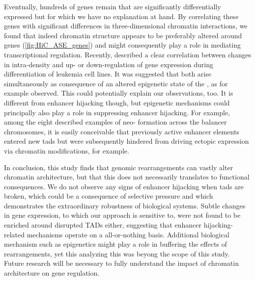 Eventually, hundreds of genes remain that are significantly differentially
expressed but for which we have no explanation at hand. By correlating these
genes with significant differences in three-dimensional chromatin interactions,
we found that indeed chromatin structure appears to be preferably altered around
\ase genes (\cref{fig:HiC_ASE_genes}) and might consequently play a role in
mediating transcriptional regulation. Recently, \cite{Li2018} described a clear
correlation between changes in intra-\tad density and up- or down-regulation of
gene expression during differentiation of leukemia cell lines. It was suggested
that both arise simultaneously as consequence of an altered epigenetic state of
the \tad, as for example \cite{LeDily2014} observed. This could potentially
explain our observations, too. It is different from enhancer hijacking though,
but epigenetic mechanisms could principally also play a role in suppressing
enhancer hijacking. For example, among the eight described examples of neo-\tad
formation across the balancer chromosomes, it is easily conceivable that
previously active enhancer elements entered new \acp{tad} but were subsequently
hindered from driving ectopic expression via chromatin modifications, for
example.

In conclusion, this study finds that genomic rearrangements can vastly alter
chromatin architecture, but that this does not necessarily translates to
functional consequences. We do not observe any signs of enhancer hijacking when
\acp{tad} are broken, which could be a consequence of selective pressure and
which demonstrates the extraordinary robustness of biological systems. Subtle
changes in gene expression, to which our approach is sensitive to, were not
found to be enriched around disrupted TADs either, suggesting that enhancer
hijacking-related mechanisms operate on a all-or-nothing basis. Additional
biological mechanism such as epigenetics might play a role in buffering the
effects of rearrangements, yet this analyzing this was beyong the scope of this
study. Future research will be necessary to fully understand the impact of
chromatin architecture on gene regulation.


